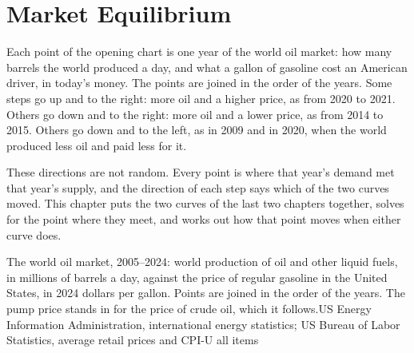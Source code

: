 \chapter{Market Equilibrium}\label{ch:g10:market-equilibrium}

Each point of the opening chart is one year of the world oil market: how many barrels the world produced a day, and what
a gallon of gasoline cost an American driver, in today's money. The points are joined in the order of the years. Some
steps go up and to the right: more oil and a higher price, as from 2020 to 2021. Others go down and to the right: more oil
and a lower price, as from 2014 to 2015. Others go down and to the left, as in 2009 and in 2020, when the world produced
less oil and paid less for it.

These directions are not random. Every point is where that year's demand met that year's supply, and the direction of each
step says which of the two curves moved. This chapter puts the two curves of the last two chapters together, solves for the
point where they meet, and works out how that point moves when either curve does.

\begin{openingchart}{The world oil market, 2005--2024: world production of oil and other liquid fuels, in millions of barrels a
day, against the price of regular gasoline in the United States, in 2024 dollars per gallon. Points are joined in the order of the
years. The pump price stands in for the price of crude oil, which it follows.}{US Energy Information Administration,
international energy statistics; US Bureau of Labor Statistics, average retail prices and CPI-U all items}
\end{openingchart}

